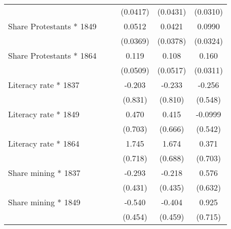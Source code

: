 {\begin{tabular}{l*{5}{c}}
                    &                     &                     &    (0.0417)         &    (0.0431)         &    (0.0310)         \\
Share Protestants * 1849&                     &                     &      0.0512         &      0.0421         &      0.0990\sym{***}\\
                    &                     &                     &    (0.0369)         &    (0.0378)         &    (0.0324)         \\
Share Protestants * 1864&                     &                     &       0.119\sym{**} &       0.108\sym{**} &       0.160\sym{***}\\
                    &                     &                     &    (0.0509)         &    (0.0517)         &    (0.0311)         \\
Literacy rate * 1837&                     &                     &      -0.203         &      -0.233         &      -0.256         \\
                    &                     &                     &     (0.831)         &     (0.810)         &     (0.548)         \\
Literacy rate * 1849&                     &                     &       0.470         &       0.415         &     -0.0999         \\
                    &                     &                     &     (0.703)         &     (0.666)         &     (0.542)         \\
Literacy rate * 1864&                     &                     &       1.745\sym{**} &       1.674\sym{**} &       0.371         \\
                    &                     &                     &     (0.718)         &     (0.688)         &     (0.703)         \\
Share mining * 1837 &                     &                     &      -0.293         &      -0.218         &       0.576         \\
                    &                     &                     &     (0.431)         &     (0.435)         &     (0.632)         \\
Share mining * 1849 &                     &                     &      -0.540         &      -0.404         &       0.925         \\
                    &                     &                     &     (0.454)         &     (0.459)         &     (0.715)         \\

\end{tabular}}
